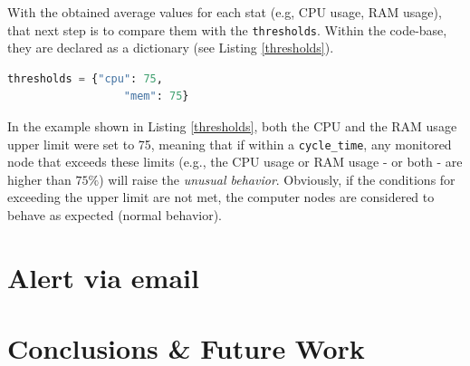 \documentclass[conference]{IEEEtran}
\begin{document}
With the obtained average values for each stat (e.g, CPU usage, RAM usage), that next step is to compare them with the \texttt{thresholds}. Within the code-base, they are declared as a dictionary (see Listing \ref{thresholds}).

\begin{lstlisting}[language=Python, caption=Declaration of some thresholds within the code-base.,basicstyle=\footnotesize,label={thresholds}]
    thresholds = {"cpu": 75,
                  "mem": 75}
\end{lstlisting}

In the example shown in Listing \ref{thresholds}, both the CPU and the RAM usage upper limit were set to 75, meaning that if within a \texttt{cycle\_time}, any monitored node that exceeds these limits (e.g., the CPU usage or RAM usage - or both - are higher than $75\%$)  will raise the \emph{unusual behavior}. Obviously, if the conditions for exceeding the upper limit are not met, the computer nodes are considered to behave as expected (normal behavior).

\section{Alert via email}
\label{section-email-alert}

\section{Conclusions \& Future Work}
\label{section-conclusions}

\end{document}

